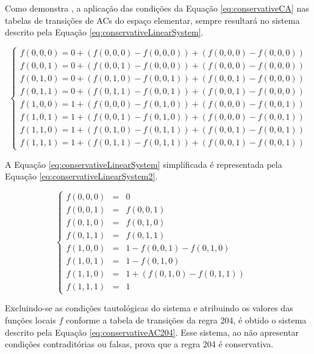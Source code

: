 \documentclass[12pt,a4paper]{article}
\begin{document}
	Como demonstra , a aplicação das condições da Equação \ref{eq:conservativeCA} nas tabelas de transições de ACs do espaço elementar, sempre resultará no sistema descrito pela Equação \ref{eq:conservativeLinearSystem}.

	\begin{equation}
	\left\{\begin{matrix}
	 f(0,0,0) = 0 + (f(0,0,0) - f(0,0,0)) + (f(0,0,0) - f(0,0,0))\\ 
	 f(0,0,1) = 0 + (f(0,0,1) - f(0,0,0)) + (f(0,0,0) - f(0,0,0))\\ 
	 f(0,1,0) = 0 + (f(0,1,0) - f(0,0,1)) + (f(0,0,1) - f(0,0,0))\\ 
	 f(0,1,1) = 0 + (f(0,1,1) - f(0,0,1)) + (f(0,0,1) - f(0,0,0))\\ 
	 f(1,0,0) = 1 + (f(0,0,0) - f(0,1,0)) + (f(0,0,0) - f(0,0,1))\\ 
	 f(1,0,1) = 1 + (f(0,0,1) - f(0,1,0)) + (f(0,0,0) - f(0,0,1))\\ 
	 f(1,1,0) = 1 + (f(0,1,0) - f(0,1,1)) + (f(0,0,1) - f(0,0,1))\\ 
	 f(1,1,1) = 1 + (f(0,1,1) - f(0,1,1)) + (f(0,0,1) - f(0,0,1))
	\end{matrix}\right.
	\label{eq:conservativeLinearSystem}
	\end{equation}

	A Equação \ref{eq:conservativeLinearSystem} simplificada é representada pela Equação \ref{eq:conservativeLinearSystem2}.

	\begin{equation}
	\left\{\begin{matrix}
	 f(0,0,0) & = & 0 		& &\\ 
	 f(0,0,1) & = & f(0,0,1)& & \\ 
	 f(0,1,0) & = & f(0,1,0)& & \\ 
	 f(0,1,1) & = & f(0,1,1)& & \\ 
	 f(1,0,0) & = & 1 - f(0,0,1) - f(0,1,0) \\ 
	 f(1,0,1) & = & 1 - f(0,1,0) \\ 
	 f(1,1,0) & = & 1 + (f(0,1,0) - f(0,1,1))\\ 
	 f(1,1,1) & = & 1 & &
	\end{matrix}\right.
	\label{eq:conservativeLinearSystem2}
	\end{equation}

	Excluindo-se as condições tautológicas do sistema e atribuindo os valores das funções locais $f$ conforme a tabela de transições da regra 204, é obtido o sistema descrito pela Equação \ref{eq:conservativeAC204}. Esse sistema, ao não apresentar condições contraditórias ou falsas, prova que a regra 204 é conservativa.
\end{document}
